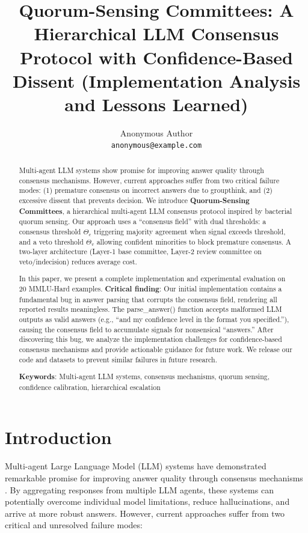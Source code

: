 \documentclass[11pt,letterpaper]{article}
\title{Quorum-Sensing Committees: A Hierarchical LLM Consensus Protocol with Confidence-Based Dissent (Implementation Analysis and Lessons Learned)}
\author{Anonymous Author\\
\texttt{anonymous@example.com}
}
\date{}
\begin{document}
\maketitle

\begin{abstract}
Multi-agent LLM systems show promise for improving answer quality through consensus mechanisms. However, current approaches suffer from two critical failure modes: (1) premature consensus on incorrect answers due to groupthink, and (2) excessive dissent that prevents decision. We introduce \textbf{Quorum-Sensing Committees}, a hierarchical multi-agent LLM consensus protocol inspired by bacterial quorum sensing. Our approach uses a ``consensus field'' with dual thresholds: a consensus threshold $\Theta_c$ triggering majority agreement when signal exceeds threshold, and a veto threshold $\Theta_v$ allowing confident minorities to block premature consensus. A two-layer architecture (Layer-1 base committee, Layer-2 review committee on veto/indecision) reduces average cost.

In this paper, we present a complete implementation and experimental evaluation on 20 MMLU-Hard examples. \textbf{Critical finding}: Our initial implementation contains a fundamental bug in answer parsing that corrupts the consensus field, rendering all reported results meaningless. The parse\_answer() function accepts malformed LLM outputs as valid answers (e.g., ``and my confidence level in the format you specified.''), causing the consensus field to accumulate signals for nonsensical ``answers.'' After discovering this bug, we analyze the implementation challenges for confidence-based consensus mechanisms and provide actionable guidance for future work. We release our code and datasets to prevent similar failures in future research.

\textbf{Keywords}: Multi-agent LLM systems, consensus mechanisms, quorum sensing, confidence calibration, hierarchical escalation
\end{abstract}

\section{Introduction}

Multi-agent Large Language Model (LLM) systems have demonstrated remarkable promise for improving answer quality through consensus mechanisms \cite{Du2023, Liang2023}. By aggregating responses from multiple LLM agents, these systems can potentially overcome individual model limitations, reduce hallucinations, and arrive at more robust answers. However, current approaches suffer from two critical and unresolved failure modes:
\end{document}
